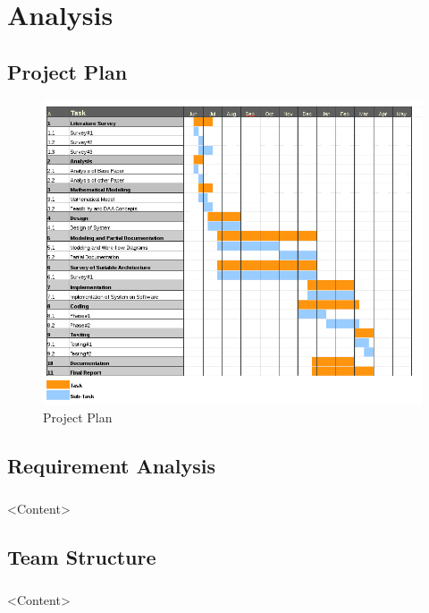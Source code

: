 \chapter{Analysis}


\section{Project Plan}
\begin{figure}[h]
	\includegraphics[width=\textwidth]{./Chapter2/gantt-chart}
		\caption{Project Plan}
\end{figure}

\section{Requirement Analysis}
\paragraph{}
<Content>

\section{Team Structure}
\paragraph{}
<Content>